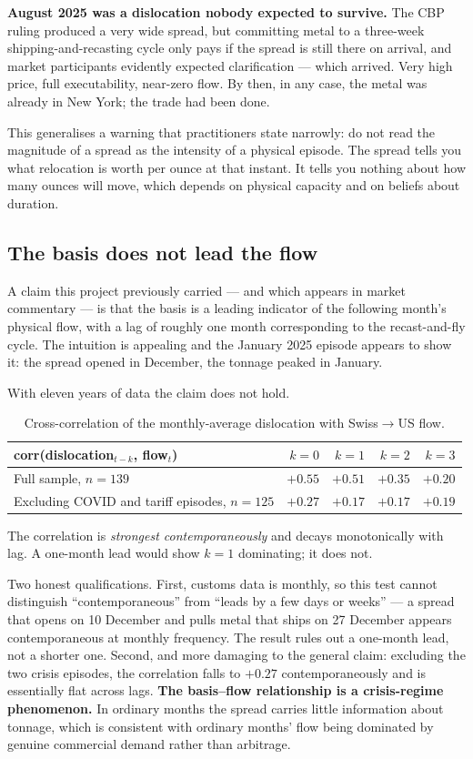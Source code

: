 \documentclass[11pt,a4paper]{article}
\begin{document}
\textbf{August 2025 was a dislocation nobody expected to survive.} The CBP ruling produced a
very wide spread, but committing metal to a three-week shipping-and-recasting cycle only pays
if the spread is still there on arrival, and market participants evidently expected
clarification --- which arrived. Very high price, full executability, near-zero flow. By then,
in any case, the metal was already in New York; the trade had been done.

This generalises a warning that practitioners state narrowly: do not read the magnitude of a
spread as the intensity of a physical episode. The spread tells you what relocation is worth
per ounce at that instant. It tells you nothing about how many ounces will move, which depends
on physical capacity and on beliefs about duration.

\subsection{The basis does not lead the flow}

A claim this project previously carried --- and which appears in market commentary --- is that
the basis is a leading indicator of the following month's physical flow, with a lag of roughly
one month corresponding to the recast-and-fly cycle. The intuition is appealing and the
January 2025 episode appears to show it: the spread opened in December, the tonnage peaked in
January.

With eleven years of data the claim does not hold.

\begin{table}[h]
\centering
\begin{tabular}{@{}lrrrr@{}}
\toprule
\textbf{corr(dislocation$_{t-k}$, flow$_t$)} & $k=0$ & $k=1$ & $k=2$ & $k=3$ \\
\midrule
Full sample, $n=139$ & \textbf{$+0.55$} & $+0.51$ & $+0.35$ & $+0.20$ \\
Excluding COVID and tariff episodes, $n=125$ & $+0.27$ & $+0.17$ & $+0.17$ & $+0.19$ \\
\bottomrule
\end{tabular}
\caption{Cross-correlation of the monthly-average dislocation with Swiss$\to$US flow.}
\end{table}

The correlation is \emph{strongest contemporaneously} and decays monotonically with lag. A
one-month lead would show $k=1$ dominating; it does not.

Two honest qualifications. First, customs data is monthly, so this test cannot distinguish
``contemporaneous'' from ``leads by a few days or weeks'' --- a spread that opens on 10 December
and pulls metal that ships on 27 December appears contemporaneous at monthly frequency. The
result rules out a one-month lead, not a shorter one. Second, and more damaging to the general
claim: excluding the two crisis episodes, the correlation falls to $+0.27$ contemporaneously
and is essentially flat across lags. \textbf{The basis--flow relationship is a crisis-regime
phenomenon.} In ordinary months the spread carries little information about tonnage, which is
consistent with ordinary months' flow being dominated by genuine commercial demand rather than
arbitrage.
\end{document}
